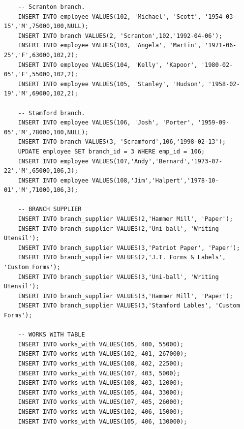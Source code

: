 \begin{verbatim}
    -- Scranton branch.
    INSERT INTO employee VALUES(102, 'Michael', 'Scott', '1954-03-15','M',75000,100,NULL);
    INSERT INTO branch VALUES(2, 'Scranton',102,'1992-04-06');
    INSERT INTO employee VALUES(103, 'Angela', 'Martin', '1971-06-25','F',63000,102,2);
    INSERT INTO employee VALUES(104, 'Kelly', 'Kapoor', '1980-02-05','F',55000,102,2);
    INSERT INTO employee VALUES(105, 'Stanley', 'Hudson', '1958-02-19','M',69000,102,2);

    -- Stamford branch.
    INSERT INTO employee VALUES(106, 'Josh', 'Porter', '1959-09-05','M',78000,100,NULL);
    INSERT INTO branch VALUES(3, 'Scramford',106,'1998-02-13');
    UPDATE employee SET branch_id = 3 WHERE emp_id = 106;
    INSERT INTO employee VALUES(107,'Andy','Bernard','1973-07-22','M',65000,106,3);
    INSERT INTO employee VALUES(108,'Jim','Halpert','1978-10-01','M',71000,106,3);

    -- BRANCH SUPPLIER
    INSERT INTO branch_supplier VALUES(2,'Hammer Mill', 'Paper');
    INSERT INTO branch_supplier VALUES(2,'Uni-ball', 'Writing Utensil');
    INSERT INTO branch_supplier VALUES(3,'Patriot Paper', 'Paper');
    INSERT INTO branch_supplier VALUES(2,'J.T. Forms & Labels', 'Custom Forms');
    INSERT INTO branch_supplier VALUES(3,'Uni-ball', 'Writing Utensil');
    INSERT INTO branch_supplier VALUES(3,'Hammer Mill', 'Paper');
    INSERT INTO branch_supplier VALUES(3,'Stamford Lables', 'Custom Forms');

    -- WORKS WITH TABLE
    INSERT INTO works_with VALUES(105, 400, 55000);
    INSERT INTO works_with VALUES(102, 401, 267000);
    INSERT INTO works_with VALUES(108, 402, 22500);
    INSERT INTO works_with VALUES(107, 403, 5000);
    INSERT INTO works_with VALUES(108, 403, 12000);
    INSERT INTO works_with VALUES(105, 404, 33000);
    INSERT INTO works_with VALUES(107, 405, 26000);
    INSERT INTO works_with VALUES(102, 406, 15000);
    INSERT INTO works_with VALUES(105, 406, 130000);
\end{verbatim}
